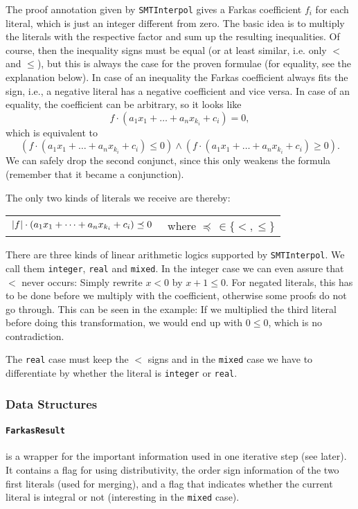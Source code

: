 \documentclass[10pt,a4paper]{article}
\newcommand{\si}{\texttt{SMTInterpol}\xspace}
\newcommand{\ttt}{\texttt}
\begin{document}
The proof annotation given by \si gives a Farkas coefficient $f_i$ for each literal, which is just an integer different from zero. The basic idea is to multiply the literals with the respective factor and sum up the resulting inequalities. Of course, then the inequality signs must be equal (or at least similar, i.e. only $<$ and $\leq$), but this is always the case for the proven formulae (for equality, see the explanation below). In case of an inequality the Farkas coefficient always fits the sign, i.e., a negative literal has a negative coefficient and vice versa. In case of an equality, the coefficient can be arbitrary, so it looks like
%
\begin{equation*}
	f \cdot (a_1 x_1 + \dots + a_n x_{k_i} + c_i) = 0,
\end{equation*}
%
which is equivalent to
%
\begin{equation*}
	(f \cdot (a_1 x_1 + \dots + a_n x_{k_i} + c_i) \leq 0) \land (f \cdot (a_1 x_1 + \dots + a_n x_{k_i} + c_i) \geq 0).
\end{equation*}
%
We can safely drop the second conjunct, since this only weakens the formula (remember that it became a conjunction).

The only two kinds of literals we receive are thereby:
%
\begin{center}
	\begin{tabular}{rl}
		$|f| \cdot (a_1 x_1 + \dots + a_n x_{k_i} + c_i) \preceq 0\color{white}{)}$ & where $\preceq \, \in \{<, \leq\}$ \\
	\end{tabular}
\end{center}
%
There are three kinds of linear arithmetic logics supported by \si. We call them \ttt{integer}, \ttt{real} and \ttt{mixed}. In the integer case we can even assure that $<$ never occurs: Simply rewrite $x < 0$ by $x + 1 \leq 0$. For negated literals, this has to be done before we multiply with the coefficient, otherwise some proofs do not go through. This can be seen in the example: If we multiplied the third literal before doing this transformation, we would end up with $0 \leq 0$, which is no contradiction.

The \ttt{real} case must keep the $<$ signs and in the \ttt{mixed} case we have to differentiate by whether the literal is \ttt{integer} or \ttt{real}.
%
\subsubsection*{Data Structures}
\paragraph*{\ttt{FarkasResult}} is a wrapper for the important information used in one iterative step (see later). It contains a flag for using distributivity, the order sign information of the two first literals (used for merging), and a flag that indicates whether the current literal is integral or not (interesting in the \ttt{mixed} case).
%
\end{document}
